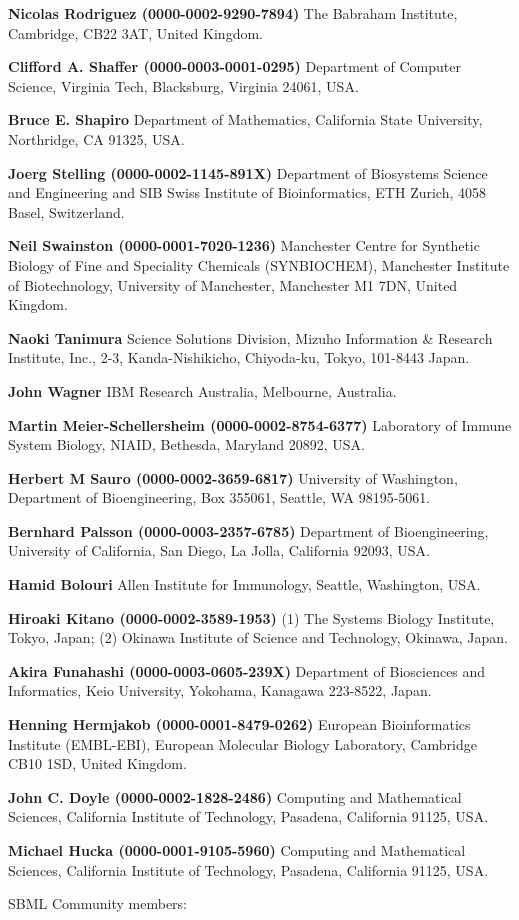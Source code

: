 \documentclass{sbml-paper}
\begin{document}
\textbf{Nicolas Rodriguez (0000-0002-9290-7894)} The Babraham Institute, Cambridge, CB22 3AT, United Kingdom.

\textbf{Clifford A. Shaffer (0000-0003-0001-0295)} Department of Computer Science, Virginia Tech, Blacksburg, Virginia 24061, USA.

\textbf{Bruce E. Shapiro} Department of Mathematics, California State University, Northridge, CA 91325, USA.

\textbf{Joerg Stelling (0000-0002-1145-891X)} Department of Biosystems Science and Engineering and SIB Swiss Institute of Bioinformatics, ETH Zurich, 4058 Basel, Switzerland.

\textbf{Neil Swainston (0000-0001-7020-1236)} Manchester Centre for Synthetic Biology of Fine and Speciality Chemicals (SYNBIOCHEM), Manchester Institute of Biotechnology, University of Manchester, Manchester M1 7DN, United Kingdom.

\textbf{Naoki Tanimura} Science Solutions Division, Mizuho Information & Research Institute, Inc., 2-3, Kanda-Nishikicho, Chiyoda-ku, Tokyo, 101-8443 Japan.

\textbf{John Wagner} IBM Research Australia, Melbourne, Australia.

\textbf{Martin Meier-Schellersheim (0000-0002-8754-6377)} Laboratory of Immune System Biology, NIAID, Bethesda, Maryland 20892, USA.

\textbf{Herbert M Sauro (0000-0002-3659-6817)} University of Washington, Department of Bioengineering, Box 355061, Seattle, WA 98195-5061.

\textbf{Bernhard Palsson (0000-0003-2357-6785)} Department of Bioengineering, University of California, San Diego, La Jolla, California 92093, USA.

\textbf{Hamid Bolouri} Allen Institute for Immunology, Seattle, Washington, USA.

\textbf{Hiroaki Kitano (0000-0002-3589-1953)} (1) The Systems Biology Institute, Tokyo, Japan; (2) Okinawa Institute of Science and Technology, Okinawa, Japan.

\textbf{Akira Funahashi (0000-0003-0605-239X)} Department of Biosciences and Informatics, Keio University, Yokohama, Kanagawa 223-8522, Japan.

\textbf{Henning Hermjakob (0000-0001-8479-0262)} European Bioinformatics Institute (EMBL-EBI), European Molecular Biology Laboratory, Cambridge CB10 1SD, United Kingdom.

\textbf{John C. Doyle (0000-0002-1828-2486)} Computing and Mathematical Sciences, California Institute of Technology, Pasadena, California 91125, USA.

\textbf{Michael Hucka (0000-0001-9105-5960)} Computing and Mathematical Sciences, California Institute of Technology, Pasadena, California 91125, USA.


SBML Community members:
\end{document}
